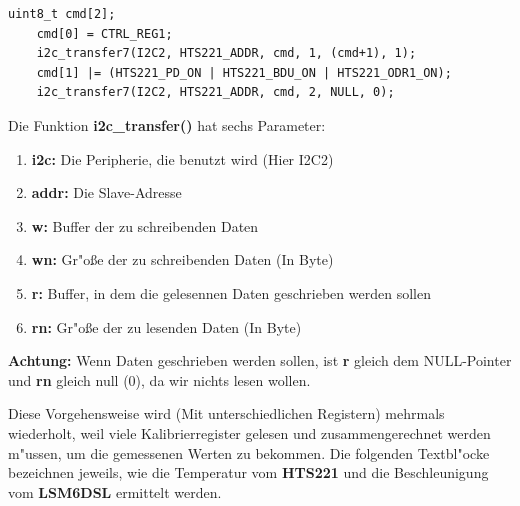 \begin{lstlisting}[frame=single]
	uint8_t cmd[2];
	cmd[0] = CTRL_REG1;
	i2c_transfer7(I2C2, HTS221_ADDR, cmd, 1, (cmd+1), 1);
	cmd[1] |= (HTS221_PD_ON | HTS221_BDU_ON | HTS221_ODR1_ON);
	i2c_transfer7(I2C2, HTS221_ADDR, cmd, 2, NULL, 0);

\end{lstlisting}
Die Funktion \textbf{i2c\_transfer()} hat sechs Parameter:

\begin{enumerate}
	\item \textbf{i2c:} Die Peripherie, die benutzt wird (Hier I2C2) 
	\item \textbf{addr:} Die Slave-Adresse  
	\item \textbf{w:} Buffer der zu schreibenden Daten
	\item \textbf{wn:} Gr"o\ss{}e der zu schreibenden Daten (In Byte)
	\item \textbf{r:} Buffer, in dem die gelesennen Daten geschrieben 
	werden sollen
	\item \textbf{rn:} Gr"o\ss{}e der zu lesenden Daten (In Byte)
\end{enumerate}

\textbf{Achtung:} Wenn Daten geschrieben werden sollen, ist \textbf{r} 
gleich dem NULL-Pointer und \textbf{rn} gleich null (0), da wir nichts 
lesen wollen.

Diese Vorgehensweise wird (Mit unterschiedlichen Registern) mehrmals 
wiederholt, weil viele Kalibrierregister gelesen und zusammengerechnet 
werden m"ussen, um die gemessenen Werten zu bekommen. Die folgenden 
Textbl"ocke bezeichnen jeweils, wie die Temperatur vom \textbf{HTS221} 
und die Beschleunigung vom \textbf{LSM6DSL} ermittelt werden.

